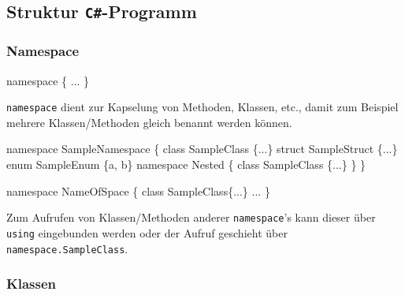 \documentclass[
  letterpaper,
  DIV=11,
  numbers=noendperiod]{scrartcl}
\newenvironment{Shaded}{\begin{snugshade}}{\end{snugshade}}
\newcommand{\KeywordTok}[1]{\textcolor[rgb]{0.00,0.23,0.31}{#1}}
\newcommand{\NormalTok}[1]{\textcolor[rgb]{0.00,0.23,0.31}{#1}}
\newcommand{\OperatorTok}[1]{\textcolor[rgb]{0.37,0.37,0.37}{#1}}
\begin{document}
\begin{multicols}{2}

\hypertarget{struktur-c-programm}{%
\subsection{\texorpdfstring{Struktur
\texttt{C\#}-Programm}{Struktur C\#-Programm}}\label{struktur-c-programm}}

\hypertarget{namespace}{%
\subsubsection{Namespace}\label{namespace}}

\begin{Shaded}
\begin{Highlighting}[]
\KeywordTok{namespace} \OperatorTok{\{} \OperatorTok{...} \OperatorTok{\}}
\end{Highlighting}
\end{Shaded}

\texttt{namespace} dient zur Kapselung von Methoden, Klassen, etc.,
damit zum Beispiel mehrere Klassen/Methoden gleich benannt werden
können.

\begin{Shaded}
\begin{Highlighting}[]
\KeywordTok{namespace}\NormalTok{ SampleNamespace }\OperatorTok{\{}
  \KeywordTok{class}\NormalTok{ SampleClass }\OperatorTok{\{...\}}
  \KeywordTok{struct}\NormalTok{ SampleStruct }\OperatorTok{\{...\}}
  \KeywordTok{enum}\NormalTok{ SampleEnum }\OperatorTok{\{}\NormalTok{a}\OperatorTok{,}\NormalTok{ b}\OperatorTok{\}}
  \KeywordTok{namespace}\NormalTok{ Nested }\OperatorTok{\{}
    \KeywordTok{class}\NormalTok{ SampleClass }\OperatorTok{\{...\}}
  \OperatorTok{\}}
\OperatorTok{\}}

\KeywordTok{namespace}\NormalTok{ NameOfSpace }\OperatorTok{\{}
  \KeywordTok{class}\NormalTok{ SampleClass}\OperatorTok{\{...\}}
  \OperatorTok{...}
\OperatorTok{\}}
\end{Highlighting}
\end{Shaded}

Zum Aufrufen von Klassen/Methoden anderer \texttt{namespace}'s kann
dieser über \texttt{using} eingebunden werden oder der Aufruf geschieht
über \texttt{namespace.SampleClass}.

\hypertarget{klassen}{%
\subsubsection{Klassen}\label{klassen}}


\end{multicols}
\end{document}
